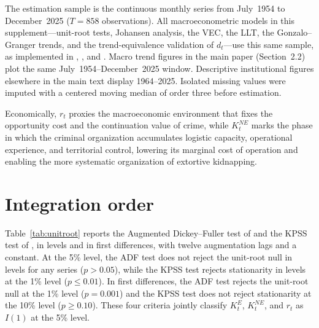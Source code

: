 \documentclass[12pt]{article}
\numberwithin{equation}{section}
\numberwithin{table}{section}
\theoremstyle{definition}
\newcommand{\KE}{K^{E}}
\newcommand{\KNE}{K^{NE}}
\begin{document}
The estimation sample is the continuous monthly series from July~1954 to
December~2025 ($T=858$ observations). All macroeconometric models in this
supplement---unit-root tests, Johansen analysis, the VEC, the LLT, the
Gonzalo--Granger trends, and the trend-equivalence validation of
$d_t$---use this same sample, as implemented in ,
, and . Macro trend
figures in the main paper (Section~2.2) plot the same July~1954--December~2025
window. Descriptive institutional figures elsewhere in the main text display
1964--2025. Isolated missing values were imputed with a centered moving median
of order three before estimation.

Economically, $r_t$ proxies the macroeconomic environment that fixes the
opportunity cost and the continuation value of crime, while $\KNE_t$ marks
the phase in which the criminal organization accumulates logistic capacity,
operational experience, and territorial control, lowering its marginal cost
of operation and enabling the more systematic organization of extortive
kidnapping.

\section{Integration order}
\label{sec:unitroot}

Table~\ref{tab:unitroot} reports the Augmented Dickey--Fuller test of
\citet{DickeyFuller1979} and the KPSS test of \citet{Kwiatkowski1992}, in
levels and in first differences, with twelve augmentation lags and a
constant. At the 5\% level, the ADF test does not reject the unit-root null in
levels for any series ($p>0.05$), while the KPSS test rejects stationarity
in levels at the 1\% level ($p\le 0.01$). In first differences, the ADF test
rejects the unit-root null at the 1\% level ($p=0.001$) and the KPSS test
does not reject stationarity at the 10\% level ($p\ge 0.10$). These four
criteria jointly classify $\KE_t$, $\KNE_t$, and $r_t$ as $I(1)$ at the 5\%
level.
\end{document}
